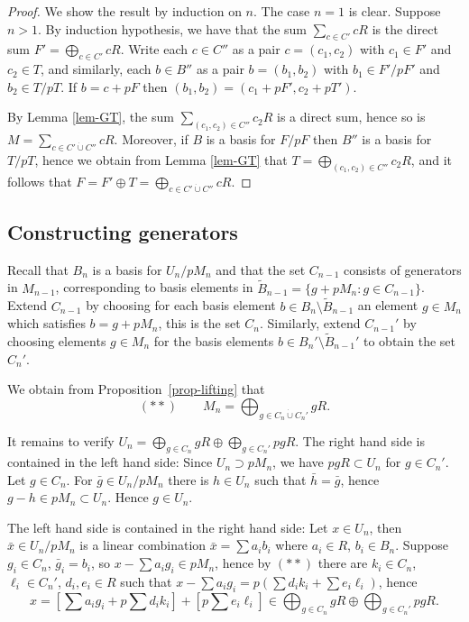 \documentclass[twoside,leqno,12pt]{amsart}
\def\dotcup{\operatorname{\dot\cup}}
\theoremstyle{definition}
\theoremstyle{remark}
\numberwithin{equation}{section}
\begin{document}
\begin{proof}
  We show the result by induction on $n$.  The case $n=1$ is clear.
  Suppose $n>1$.  By induction hypothesis, we have that the sum
  $\sum_{c\in C'} cR$ is the direct sum $F'=\bigoplus_{c\in C'}cR$.
  Write each $c\in C''$ as a pair $c=(c_1,c_2)$ with $c_1\in F'$ and $c_2\in T$,
  and similarly, each $b\in B''$ as a pair $b=(b_1,b_2)$ with $b_1\in F'/pF'$
  and $b_2\in T/pT$.  If $b=c+pF$ then $(b_1,b_2)=(c_1+pF',c_2+pT')$.


  By Lemma \ref{lem-GT}, the sum $\sum_{(c_1,c_2)\in C''}c_2R$ is a direct sum,
  hence so is $M=\sum_{c\in C'\dotcup C''}cR$.
  Moreover, if $B$ is a basis for $F/pF$ then $B''$ is a basis for $T/pT$,
  hence we obtain from Lemma \ref{lem-GT} that $T=\bigoplus_{(c_1,c_2)\in C''}c_2R$,
  and it follows that $F=F'\oplus T=\bigoplus_{c\in C'\dotcup C''} cR$.
\end{proof}

\subsection{Constructing generators}

Recall that $B_n$ is a basis for $U_n/pM_n$ and that
the set $C_{n-1}$ consists of generators in $M_{n-1}$, corresponding to
basis elements in $\tilde B_{n-1}=\{g+pM_n:g\in C_{n-1} \}$.
  Extend $C_{n-1}$ by choosing for each basis element
$b\in B_n\setminus \tilde B_{n-1}$ an element $g\in M_n$ which satisfies $b=g+pM_n$, this is the set $C_n$.
Similarly, extend $C_{n-1}'$ by choosing elements $g\in M_n$ for the basis elements
$b\in B_n'\setminus \tilde B_{n-1}'$ to obtain the set $C_n'$.


We obtain from Proposition~\ref{prop-lifting} that
$$(**)\qquad M_n=\bigoplus_{g\in C_n\dotcup C_n'} gR.$$


It remains to verify $U_n=\bigoplus_{g\in C_n} gR\oplus \bigoplus_{g\in C_n'} pgR$.
  The right hand side is contained in the left hand side:
  Since $U_n\supset pM_n$, we have $pgR\subset U_n$ for $g\in C_n'$.
  Let $g\in C_n$.  For $\bar g\in U_n/pM_n$ there is $h\in U_n$
  such that $\bar h=\bar g$, hence $g-h\in p{M_n}\subset U_n$.  Hence $g\in U_n$.

  The left hand side is contained in the right hand side:
  Let $x\in U_n$, then $\bar x\in U_n/pM_n$ is a linear combination
  $\bar x=\sum a_i b_i$ where $a_i\in R$, $b_i\in B_n$.
  Suppose $g_i\in C_n$, $\bar g_i=b_i$, so $x-\sum a_ig_i\in pM_n$,
  hence by $(**)$ there are $k_i\in C_n$, $\ell_i\in C_n'$,
  $d_i,e_i\in R$
  such that $x-\sum a_ig_i=p(\sum d_ik_i+\sum e_i\ell_i)$, hence
  $$x=[\sum a_ig_i+p\sum d_ik_i]+[p\sum e_i\ell_i]
  \in \bigoplus_{g\in C_n}gR\oplus \bigoplus_{g\in C_n'}pgR.$$
\end{document}
